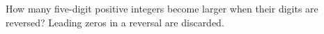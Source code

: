 How many five-digit positive integers become larger when their digits are reversed? Leading zeros in a reversal are discarded.
